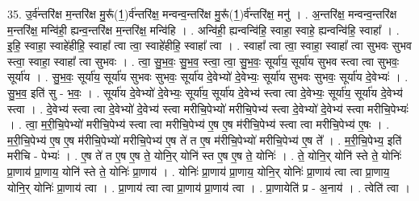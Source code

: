 \documentclass[17pt]{extarticle}
\begin{document}
35. उ॒र्व॑न्तरि॑क्ष म॒न्तरि॑क्ष मु॒रू᳚(1॒)र्व॑न्तरि॑क्ष॒ मन्वन्व॒न्तरि॑क्ष मु॒रू᳚(1॒)र्व॑न्तरि॑क्ष॒ मनु॑ । . अ॒न्तरि॑क्ष॒ मन्वन्व॒न्तरि॑क्ष म॒न्तरि॑क्ष॒ मन्वि॑ही॒ ह्यन्व॒न्तरि॑क्ष म॒न्तरि॑क्ष॒ मन्वि॑हि । . अन्वि॑ही॒ ह्यन्वन्वि॑हि॒ स्वाहा॒ स्वाहे॒ ह्यन्वन्वि॑हि॒ स्वाहा᳚ । . इ॒हि॒ स्वाहा॒ स्वाहे॑हीहि॒ स्वाहा᳚ त्वा त्वा॒ स्वाहे॑हीहि॒ स्वाहा᳚ त्वा । . स्वाहा᳚ त्वा त्वा॒ स्वाहा॒ स्वाहा᳚ त्वा सुभवः सुभव स्त्वा॒ स्वाहा॒ स्वाहा᳚ त्वा सुभवः । . त्वा॒ सु॒भ॒वः॒ सु॒भ॒व॒ स्त्वा॒ त्वा॒ सु॒भ॒वः॒ सूर्या॑य॒ सूर्या॑य सुभव स्त्वा त्वा सुभवः॒ सूर्या॑य । . सु॒भ॒वः॒ सूर्या॑य॒ सूर्या॑य सुभवः सुभवः॒ सूर्या॑य दे॒वेभ्यो॑ दे॒वेभ्यः॒ सूर्या॑य सुभवः सुभवः॒ सूर्या॑य दे॒वेभ्यः॑ । . सु॒भ॒व॒ इति॑ सु - भ॒वः॒ । . सूर्या॑य दे॒वेभ्यो॑ दे॒वेभ्यः॒ सूर्या॑य॒ सूर्या॑य दे॒वेभ्य॑ स्त्वा त्वा दे॒वेभ्यः॒ सूर्या॑य॒ सूर्या॑य दे॒वेभ्य॑ स्त्वा । . दे॒वेभ्य॑ स्त्वा त्वा दे॒वेभ्यो॑ दे॒वेभ्य॑ स्त्वा मरीचि॒पेभ्यो॑ मरीचि॒पेभ्य॑ स्त्वा दे॒वेभ्यो॑ दे॒वेभ्य॑ स्त्वा मरीचि॒पेभ्यः॑ । . त्वा॒ म॒री॒चि॒पेभ्यो॑ मरीचि॒पेभ्य॑ स्त्वा त्वा मरीचि॒पेभ्य॑ ए॒ष ए॒ष म॑रीचि॒पेभ्य॑ स्त्वा त्वा मरीचि॒पेभ्य॑ ए॒षः । . म॒री॒चि॒पेभ्य॑ ए॒ष ए॒ष म॑रीचि॒पेभ्यो॑ मरीचि॒पेभ्य॑ ए॒ष ते॑ त ए॒ष म॑रीचि॒पेभ्यो॑ मरीचि॒पेभ्य॑ ए॒ष ते᳚ । . म॒री॒चि॒पेभ्य॒ इति॑ मरीचि - पेभ्यः॑ । . ए॒ष ते॑ त ए॒ष ए॒ष ते॒ योनि॒र् योनि॑ स्त ए॒ष ए॒ष ते॒ योनिः॑ । . ते॒ योनि॒र् योनि॑ स्ते ते॒ योनिः॑ प्रा॒णाय॑ प्रा॒णाय॒ योनि॑ स्ते ते॒ योनिः॑ प्रा॒णाय॑ । . योनिः॑ प्रा॒णाय॑ प्रा॒णाय॒ योनि॒र् योनिः॑ प्रा॒णाय॑ त्वा त्वा प्रा॒णाय॒ योनि॒र् योनिः॑ प्रा॒णाय॑ त्वा । . प्रा॒णाय॑ त्वा त्वा प्रा॒णाय॑ प्रा॒णाय॑ त्वा । . प्रा॒णायेति॑ प्र - अ॒नाय॑ । . त्वेति॑ त्वा । \newline
\pagebreak
{}
\end{document}
